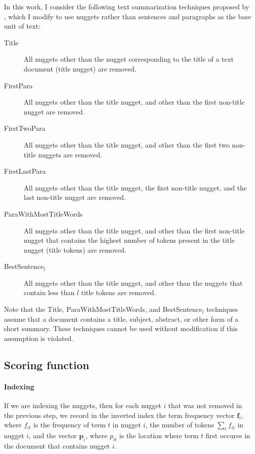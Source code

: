 \documentclass[
  digital, %
  notable, %
  lof,     %
  lot,     %
  nopalatino, color
]{fithesis3}
\let\subsubsection=\paragraph
\begin{document}
In this work, I consider the following text summarization techniques proposed
by \textcite{kolczetal00}, which I modify to use nuggets rather than
sentences and paragraphs as the base unit of text:
\begin{description}
\item[Title] All nuggets other than the nugget corresponding to the title of a
  text document (title nugget) are removed.
\item[FirstPara] All nuggets other than the title nugget, and other than the
  first non-title nugget are removed.
\item[FirstTwoPara] All nuggets other than the title nugget, and other than the
  first two non-title nuggets are removed.
\item[FirstLastPara] All nuggets other than the title nugget, the first
  non-title nugget, and the last non-title nugget are removed.
\item[ParaWithMostTitleWords] All nuggets other than the title nugget, and
  other than the first non-title nugget that contains the highest number of
  tokens present in the title nugget (title tokens) are removed.
\item[BestSentence${}_l$] All nuggets other than the title nugget, and other than
  the nuggets that contain less than $l$ title tokens are removed.
\end{description}
Note that the Title,
ParaWithMostTitleWords,
and BestSentence${}_l$ techniques
assume that a document contains a title, subject, abstract, or other form of a
short summary. These techniques cannot be used without modification if this
assumption is violated.

\subsection{Scoring function}
\label{sec:segmentation-scoring-function}
\subsubsection{Indexing}
If we are indexing the nuggets, then for each nugget $i$ that was not removed
in the previous step, we record in the inverted index the term frequency vector
$\mathbf{f}_i$, where $f_{it}$ is the frequency of
term $t$ in nugget $i$,
the number of tokens $\sum_t f_{it}$ in nugget $i$, and the vector
$\mathbf{p}_i$, where $p_{it}$ is the location where term $t$ first occures in
the document that contains nugget $i$.
\end{document}
